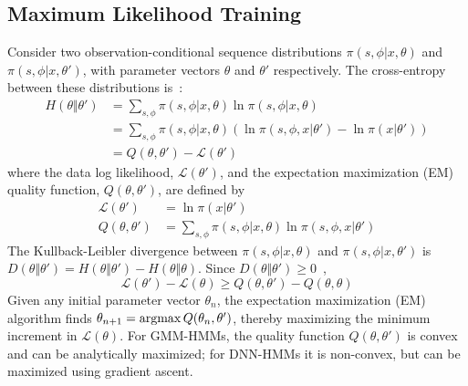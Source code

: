 \subsection{Maximum Likelihood Training}

Consider two observation-conditional sequence distributions
$\pi(s,\phi|x,\theta)$ and $\pi(s,\phi|x,\theta')$, with parameter
vectors $\theta$ and $\theta'$ respectively.  The cross-entropy
between these distributions is~\cite{Dempster77}:
\begin{align}
  H\left(\theta\Vert\theta'\right) &=
  \sum_{s,\phi} \pi(s,\phi|x,\theta)
  \ln \pi(s,\phi|x,\theta)\\
  &=   \sum_{s,\phi} \pi(s,\phi|x,\theta)
  \left(\ln \pi(s,\phi,x|\theta')-\ln \pi(x|\theta')\right)\\
  &=  Q\left(\theta,\theta'\right)-{\mathcal L}\left(\theta'\right)
  \label{eq:crossentropy}
\end{align}
where the data log likelihood, ${\mathcal L}\left(\theta'\right)$, and
the expectation maximization (EM) quality function,
$Q\left(\theta,\theta'\right)$, are defined by
\begin{align}
  {\mathcal L}\left(\theta'\right) &= \ln \pi(x|\theta')
  \label{eq:loglikelihood}\\
  Q\left(\theta,\theta'\right)
  &=
  \sum_{s,\phi} \pi(s,\phi|x,\theta)\ln \pi(s,\phi,x|\theta')
   \label{eq:Qfunction}
\end{align}
The Kullback-Leibler divergence between $\pi(s,\phi|x,\theta)$ and
$\pi(s,\phi|x,\theta')$ is $D\left(\theta\Vert\theta'\right)=
H\left(\theta\Vert\theta'\right)-H\left(\theta\Vert\theta\right)$.
Since $D\left(\theta\Vert\theta'\right)\ge 0$~\cite{Shannon49},
\begin{equation}
  {\mathcal L}\left(\theta'\right)-{\mathcal L}\left(\theta\right)\ge
  Q\left(\theta,\theta'\right)-
  Q\left(\theta,\theta\right)
  \label{eq:LgeQ}
\end{equation}
Given any initial parameter vector $\theta_n$, the expectation
maximization (EM) algorithm finds $\theta_{n+1}=\operatorname*{argmax}
Q(\theta_n,\theta')$, thereby maximizing the minimum increment in
${\mathcal L}(\theta)$.  For GMM-HMMs, the quality function
$Q\left(\theta,\theta'\right)$ is convex and can be analytically
maximized; for DNN-HMMs it is non-convex, but can be maximized using
gradient ascent.

